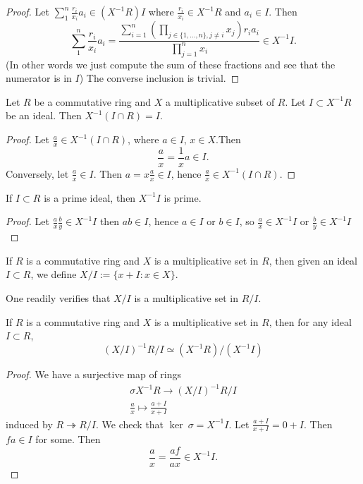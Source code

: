 \begin{proof}
    Let $\sum_1^n \frac{r_i}{x_i}a_i\in (X^{-1}R)I$ where $\frac{r_i}{x_i}\in X^{-1}R$ and $a_i\in I$. Then 
    $$\sum_1^n \frac{r_i}{x_i}a_i= \frac{\sum_{i=1}^n\left(\prod_{j\in \{1,\dots,n\}, j\neq i} x_j\right) r_ia_i}{\prod_{j=1}^n x_i}\in X^{-1}I.$$
    (In other words we just compute the sum of these fractions and see that the numerator is in $I$)
    The converse inclusion is trivial. 
\end{proof}
\begin{lemma}\label{LocalizationOfEliminationIdealGenerateOriginalIdeal}
    Let $R$ be a commutative ring and $X$ a multiplicative subset of $R$. Let $I\subset X^{-1}R$ be an ideal. Then $X^{-1}(I\cap R) = I$.
\end{lemma}
\begin{proof}
    Let $\frac{a}{x}\in X^{-1}(I\cap R)$, where $a\in I$, $x\in X$.Then 
    $$\frac{a}{x}=\frac{1}{x}a\in I.$$
    Conversely, let $\frac{a}{x}\in I$. Then $a=x\frac{a}{x}\in I$, hence $\frac{a}{x}\in X^{-1}(I\cap R)$.
\end{proof}
\begin{corollary}\label{LocalizationPreservePrimeness}
    If $I\subset R$ is a prime ideal, then $X^{-1}I$ is prime. 
\end{corollary}
\begin{proof}
    Let $\frac{a}{x}\frac{b}{y}\in X^{-1}I$ then $ab\in I$, hence $a\in I$ or $b\in I$, so $\frac{a}{x}\in X^{-1}I$ or $\frac{b}{y}\in X^{-1}I$
\end{proof}
\begin{definition}
    If $R$ is a commutative ring and $X$ is a multiplicative set in $R$, then given an ideal $I\subset R$, we define $X/I := \{x+I:x\in X\}$.
\end{definition}
\begin{remark}
    One readily verifies that $X/I$ is a multiplicative set in $R/I$. 
\end{remark}
\begin{lemma}\label{QuotientRingsAndTakingLocalization}
    If $R$ is a commutative ring and $X$ is a multiplicative set in $R$, then for any ideal $I\subset R$,
    $$
        (X/I)^{-1}R/I \simeq (X^{-1}R)/(X^{-1}I)
    $$
\end{lemma}
\begin{proof}
    We have a surjective map of rings 
    \begin{gather*}
        \sigma X^{-1}R \rightarrow (X/I)^{-1}R/I\\
        \frac{a}{x}\mapsto \frac{a+I}{x+I}
    \end{gather*}
    induced by $R\twoheadrightarrow R/I$. We check that $\ker\ \sigma = X^{-1}I$. Let $\frac{a+I}{x+I}=0+I$. Then $fa\in I$ for some. Then 
    $$\frac{a}{x}=\frac{af}{ax} \in X^{-1}I.$$ 
\end{proof}
